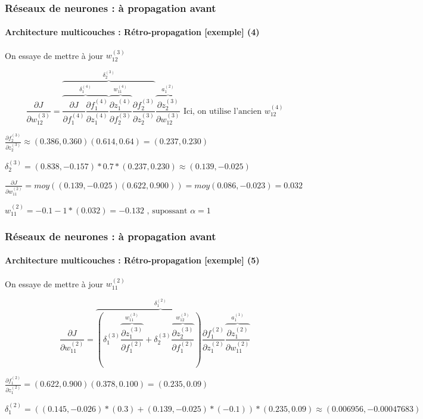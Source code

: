 \documentclass[xcolor=table]{beamer}
\begin{document}
\begin{frame}
\frametitle{Réseaux de neurones : à propagation avant}
\framesubtitle{Architecture multicouches : Rétro-propagation [exemple] (4)}

On essaye de mettre à jour $w_{12}^{(3)}$

\small

\[
\frac{\partial J}{\partial w_{12}^{(3)}} = 
\overbrace{
	\overbrace{
		\frac{\partial J}{\partial f_{1}^{(4)}} 
		\frac{\partial f_{1}^{(4)}}{\partial z_{1}^{(4)}}
	}^{\delta_{1}^{(4)}} 
	\overbrace{
		\frac{\partial z_{1}^{(4)}}{\partial f_{2}^{(3)}}
	}^{w_{11}^{(4)}} 
	\frac{\partial f_{2}^{(3)}}{\partial z_{2}^{(3)}} 
}^{\delta_{2}^{(3)}} 
\overbrace{
	\frac{\partial z_{2}^{(3)}}{\partial w_{12}^{(3)}}
}^{a_{1}^{(2)}}
\text{ Ici, on utilise l'ancien } w_{12}^{(4)}
\]

$
\frac{\partial f_{2}^{(3)}}{\partial z_{2}^{(3)}} \approx 
(0.386, 0.360) (0.614, 0.64) = (0.237, 0.230)
$

$
\delta_{2}^{(3)} = (0.838, -0.157) * 0.7 * (0.237, 0.230) \approx (0.139, -0.025)
$

$
\frac{\partial J}{\partial w_{11}^{(2)}} = moy((0.139, -0.025) (0.622, 0.900)) 
= moy(0.086, -0.023) = 0.032
$

$
w_{11}^{(2)} = - 0.1 - 1 * (0.032) = - 0.132 \text{ , supossant } \alpha = 1
$

\end{frame}


\begin{frame}
\frametitle{Réseaux de neurones : à propagation avant}
\framesubtitle{Architecture multicouches : Rétro-propagation [exemple] (5)}

On essaye de mettre à jour $w_{11}^{(2)}$

\small

\[
\frac{\partial J}{\partial w_{11}^{(2)}} = 
\overbrace{ 
\left(
	\delta_{1}^{(3)} 
	\overbrace{
		\frac{\partial z_{1}^{(3)}}{\partial f_{1}^{(2)}}
	}^{w_{11}^{(3)}}
	+
	\delta_{2}^{(3)} 
	\overbrace{
		\frac{\partial z_{2}^{(3)}}{\partial f_{1}^{(2)}}
	}^{w_{12}^{(3)}}
\right)
\frac{\partial f_{1}^{(2)}}{\partial z_{1}^{(2)}}
}^{\delta_{1}^{(2)}} 
\overbrace{
	\frac{\partial z_{1}^{(2)}}{\partial w_{11}^{(2)}}
}^{a_{1}^{(1)}}
\]

$
\frac{\partial f_{1}^{(2)}}{\partial z_{1}^{(2)}} = (0.622, 0.900) (0.378, 0.100) = (0.235, 0.09)
$

$
\delta_{1}^{(2)} = \left((0.145, -0.026) * (0.3) + (0.139, -0.025) * (-0.1)\right) * (0.235, 0.09) \approx (0.006956, -0.00047683)
$


%

\end{frame}
\end{document}
